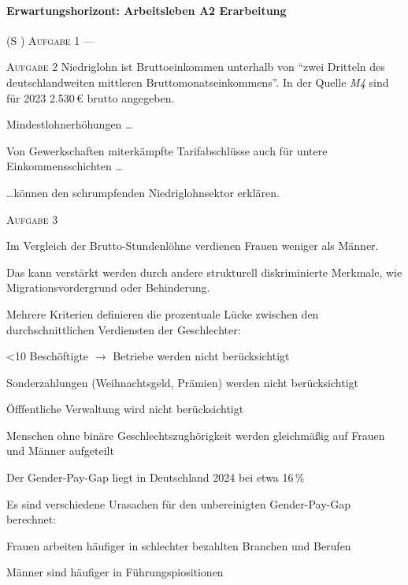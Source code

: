 \paragraph{Erwartungshorizont: Arbeitsleben A2 Erarbeitung} (\gls{S} \pageref{ARBEITSLEBEN-A2})
\textsc{Aufgabe 1} \quad 
--- 

\textsc{Aufgabe 2} \quad
Niedriglohn ist Bruttoeinkommen unterhalb von \enquote{zwei Dritteln des deutschlandweiten mittleren Bruttomonatseinkommens}.
In der Quelle \emph{M4} sind für 2023 2.530\,€ brutto angegeben. 

\begin{myitemize}
    \item Mindestlohnerhöhungen \dots
    \item Von Gewerkschaften miterkämpfte Tarifabschlüsse auch für untere Einkommensschichten \dots
\end{myitemize}
\dots können den schrumpfenden Niedriglohnsektor erklären. 

\textsc{Aufgabe 3} \quad
\begin{myitemize}
    \item Im Vergleich der Brutto-Stundenlöhne verdienen Frauen weniger als Männer.
    \item Das kann verstärkt werden durch andere strukturell diskriminierte Merkmale, wie Migrationsvordergrund oder Behinderung. 
    \item Mehrere Kriterien definieren die prozentuale Lücke zwischen den durchschnittlichen Verdiensten der Geschlechter:
    \begin{myitemize}
        \item <10 Beschöftigte $\rightarrow$ Betriebe werden nicht berücksichtigt
        \item Sonderzahlungen (Weihnachtsgeld, Prämien) werden nicht berücksichtigt
        \item Öfffentliche Verwaltung wird nicht berücksichtigt
        \item Menschen ohne binäre Geschlechtszughörigkeit werden gleichmäßig auf Frauen und Männer aufgeteilt
    \end{myitemize}
    \item Der Gender-Pay-Gap liegt in Deutschland 2024 bei etwa 16\,\%
    \item Es sind verschiedene Urasachen für den unbereinigten Gender-Pay-Gap berechnet:
    \begin{myitemize}
        \item Frauen arbeiten häufiger in schlechter bezahlten Branchen und Berufen
        \item Männer sind häufiger in Führungspiositionen
        \item 
    \end{myitemize}
    \item 
\end{myitemize}





